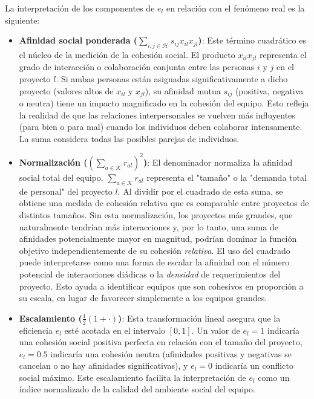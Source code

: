 \documentclass[conference]{IEEEtran}
\begin{document}
La interpretación de los componentes de \(e_l\) en relación con el fenómeno real es la siguiente:
\begin{itemize}
    \item \textbf{Afinidad social ponderada (\(\sum_{i,j \in \mathcal{H}} s_{ij} x_{il} x_{jl}\))}: Este término cuadrático es el núcleo de la medición de la cohesión social. El producto \(x_{il} x_{jl}\) representa el grado de interacción o colaboración conjunta entre las personas \(i\) y \(j\) en el proyecto \(l\). Si ambas personas están asignadas significativamente a dicho proyecto (valores altos de \(x_{il}\) y \(x_{jl}\)), su afinidad mutua \(s_{ij}\) (positiva, negativa o neutra) tiene un impacto magnificado en la cohesión del equipo. Esto refleja la realidad de que las relaciones interpersonales se vuelven más influyentes (para bien o para mal) cuando los individuos deben colaborar intensamente. La suma considera todas las posibles parejas de individuos.
    \item \textbf{Normalización (\(\left(\sum_{a \in \mathcal{K}} r_{al}\right)^2\))}: El denominador normaliza la afinidad social total del equipo. \(\sum_{a \in \mathcal{K}} r_{al}\) representa el "tamaño" o la "demanda total de personal" del proyecto \(l\). Al dividir por el cuadrado de esta suma, se obtiene una medida de cohesión relativa que es comparable entre proyectos de distintos tamaños. Sin esta normalización, los proyectos más grandes, que naturalmente tendrían más interacciones y, por lo tanto, una suma de afinidades potencialmente mayor en magnitud, podrían dominar la función objetivo independientemente de su cohesión \emph{relativa}. El uso del cuadrado puede interpretarse como una forma de escalar la afinidad con el número potencial de interacciones diádicas o la \emph{densidad} de requerimientos del proyecto. Esto ayuda a identificar equipos que son cohesivos en proporción a su escala, en lugar de favorecer simplemente a los equipos grandes.
    \item \textbf{Escalamiento (\( \frac{1}{2}(1 + \cdot) \))}: Esta transformación lineal asegura que la eficiencia \(e_l\) esté acotada en el intervalo \([0,1]\). Un valor de \(e_l = 1\) indicaría una cohesión social positiva perfecta en relación con el tamaño del proyecto, \(e_l = 0.5\) indicaría una cohesión neutra (afinidades positivas y negativas se cancelan o no hay afinidades significativas), y \(e_l = 0\) indicaría un conflicto social máximo. Este escalamiento facilita la interpretación de \(e_l\) como un índice normalizado de la calidad del ambiente social del equipo.
\end{itemize}
\end{document}
